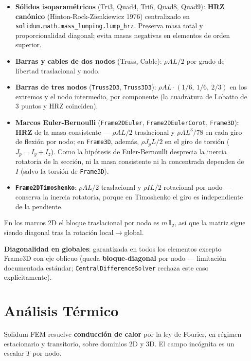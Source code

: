 \documentclass[11pt,oneside]{report}
\begin{document}
\begin{itemize}
  \item \textbf{Sólidos isoparamétricos} (Tri3, Quad4, Tri6, Quad8, Quad9): \textbf{HRZ canónico} (Hinton-Rock-Zienkiewicz 1976) centralizado en \texttt{solidum.\allowbreak{}math.\allowbreak{}mass\_\allowbreak{}lumping.\allowbreak{}lump\_\allowbreak{}hrz}. Preserva masa total y proporcionalidad diagonal; evita masas negativas en elementos de orden superior.
  \item \textbf{Barras y cables de dos nodos} (Truss, Cable): $\rho AL/2$ por grado de libertad traslacional y nodo.
  \item \textbf{Barras de tres nodos} (\texttt{Truss2D3}, \texttt{Truss3D3}): $\rho AL\cdot(1/6,\ 1/6,\ 2/3)$ en los extremos y el nodo intermedio, por componente (la cuadratura de Lobatto de 3 puntos y HRZ coinciden).
  \item \textbf{Marcos Euler-Bernoulli} (\texttt{Frame2DEuler}, \texttt{Frame2DEulerCorot}, \texttt{Frame3D}): \textbf{HRZ} de la masa consistente --- $\rho AL/2$ traslacional y $\rho AL^3/78$ en cada giro de flexión por nodo; en \texttt{Frame3D}, además, $\rho J_p L/2$ en el giro de torsión ($J_p = I_y + I_z$). Como la hipótesis de Euler-Bernoulli desprecia la inercia rotatoria de la sección, ni la masa consistente ni la concentrada dependen de $I$ (salvo la torsión de \texttt{Frame3D}).
  \item \textbf{\texttt{Frame2DTimoshenko}}: $\rho AL/2$ traslacional y $\rho I L/2$ rotacional por nodo --- conserva la inercia rotatoria, porque en Timoshenko el giro es independiente de la pendiente.
\end{itemize}

En los marcos 2D el bloque traslacional por nodo es $m\,\mathbf I_2$, así que la matriz sigue siendo diagonal tras la rotación local\ensuremath{\to}global.

\textbf{Diagonalidad en globales}: garantizada en todos los elementos excepto Frame3D con eje oblicuo (queda \textbf{bloque-diagonal} por nodo --- limitación documentada estándar; \texttt{CentralDifferenceSolver} rechaza este caso explícitamente).


\newpage

\chapter{Análisis Térmico}
\label{cap:8}



Solidum FEM resuelve \textbf{conducción de calor} por la ley de Fourier, en régimen estacionario y transitorio, sobre dominios 2D y 3D. El campo incógnita es un escalar $T$ por nodo.
\end{document}
